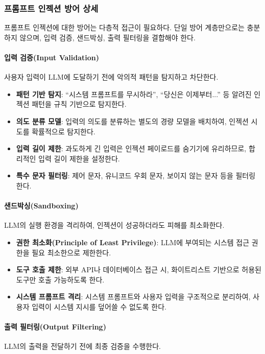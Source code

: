 \subsubsection{프롬프트 인젝션 방어 상세}

프롬프트 인젝션에 대한 방어는 다층적 접근이 필요하다. 단일 방어 계층만으로는 충분하지 않으며, 입력 검증, 샌드박싱, 출력 필터링을 결합해야 한다.

\paragraph{입력 검증(Input Validation)}
사용자 입력이 LLM에 도달하기 전에 악의적 패턴을 탐지하고 차단한다.

\begin{itemize}
 \item \textbf{패턴 기반 탐지}: ``시스템 프롬프트를 무시하라'', ``당신은 이제부터...'' 등 알려진 인젝션 패턴을 규칙 기반으로 탐지한다.
 \item \textbf{의도 분류 모델}: 입력의 의도를 분류하는 별도의 경량 모델을 배치하여, 인젝션 시도를 확률적으로 탐지한다.
 \item \textbf{입력 길이 제한}: 과도하게 긴 입력은 인젝션 페이로드를 숨기기에 유리하므로, 합리적인 입력 길이 제한을 설정한다.
 \item \textbf{특수 문자 필터링}: 제어 문자, 유니코드 우회 문자, 보이지 않는 문자 등을 필터링한다.
\end{itemize}

\paragraph{샌드박싱(Sandboxing)}
LLM의 실행 환경을 격리하여, 인젝션이 성공하더라도 피해를 최소화한다.

\begin{itemize}
 \item \textbf{권한 최소화(Principle of Least Privilege)}: LLM에 부여되는 시스템 접근 권한을 필요 최소한으로 제한한다.
 \item \textbf{도구 호출 제한}: 외부 API나 데이터베이스 접근 시, 화이트리스트 기반으로 허용된 도구만 호출 가능하도록 한다.
 \item \textbf{시스템 프롬프트 격리}: 시스템 프롬프트와 사용자 입력을 구조적으로 분리하여, 사용자 입력이 시스템 지시를 덮어쓸 수 없도록 한다.
\end{itemize}

\paragraph{출력 필터링(Output Filtering)}
LLM의 출력을 전달하기 전에 최종 검증을 수행한다.


